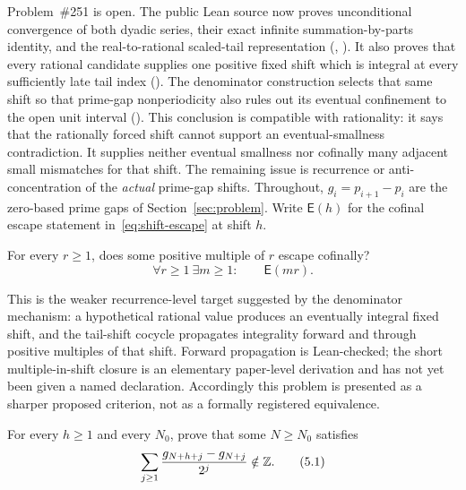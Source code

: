 \documentclass[11pt]{article}
\begin{document}
Problem~\#251 is open.  The public Lean source now proves unconditional
convergence of both dyadic series, their exact infinite summation-by-parts
identity, and the real-to-rational scaled-tail representation
(,
).
It also proves that every rational candidate supplies one positive fixed shift
which is integral at every sufficiently late tail index
().
The denominator construction selects that same shift so that prime-gap
nonperiodicity also rules out its eventual confinement to the open unit
interval
().
This conclusion is compatible with rationality: it says that the rationally
forced shift cannot support an eventual-smallness contradiction.  It supplies
neither eventual smallness nor cofinally many adjacent small mismatches for
that shift.
The remaining issue is recurrence or anti-concentration of the \emph{actual}
prime-gap shifts.  Throughout, $g_i=p_{i+1}-p_i$ are the zero-based prime gaps
of Section~\ref{sec:problem}.  Write $\mathsf E(h)$ for the cofinal escape
statement in~\eqref{eq:shift-escape} at shift $h$.

\begin{problem}\label{prob:divisor-hit}
For every $r\ge1$, does some positive multiple of $r$ escape cofinally?
\[
  \forall r\ge1\ \exists m\ge1:\qquad \mathsf E(mr).
\]
\end{problem}

\noindent This is the weaker recurrence-level target suggested by the
denominator mechanism: a hypothetical rational value produces an eventually
integral fixed shift, and the tail-shift cocycle propagates integrality forward
and through positive multiples of that shift.  Forward propagation is
Lean-checked; the short multiple-in-shift closure is an elementary paper-level
derivation and has not yet been given a named declaration.  Accordingly this
problem is presented as a sharper proposed criterion, not as a formally
registered equivalence.

\begin{problem}\label{prob:escape}
For every $h\ge1$ and every $N_0$, prove that some $N\ge N_0$ satisfies
\[
 \sum_{j\ge1}
 \frac{g_{N+h+j}-g_{N+j}}{2^j}\notin\Z .
\tag{5.1}\label{eq:shift-escape}
\]
\end{problem}
\end{document}
